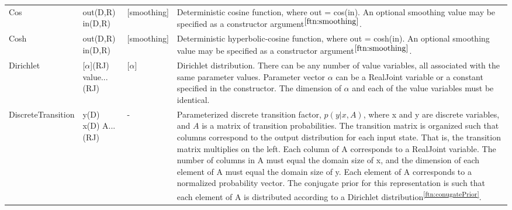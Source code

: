 \begin{longtable} {p{3.5cm} p{2.2cm} p{2cm} p{7cm}}
%
Cos & out(D,R) \newline in(D,R) & [smoothing] & Deterministic cosine function, where out = cos(in). An optional smoothing value may be specified as a constructor argument$^{\ref{ftn:smoothing}}$. \\
%
Cosh & out(D,R) \newline in(D,R) & [smoothing] & Deterministic hyperbolic-cosine function, where out = cosh(in). An optional smoothing value may be specified as a constructor argument$^{\ref{ftn:smoothing}}$. \\
%
Dirichlet & [$\alpha$](RJ) \newline value...(RJ) & [$\alpha$] & Dirichlet distribution.  There can be any number of value variables, all associated with the same parameter values.  Parameter vector $\alpha$ can be a RealJoint variable or a constant specified in the constructor.  The dimension of $\alpha$ and each of the value variables must be identical. \\
%
DiscreteTransition & y(D) \newline x(D) \newline A...(RJ) & - & 
Parameterized discrete transition factor, $p(y | x, A)$, where x and y are discrete variables, and $A$ is a matrix of transition probabilities. The transition matrix is organized such that columns correspond to the output distribution for each input state. That is, the transition matrix multiplies on the left. Each column of A corresponds to a RealJoint variable. The number of columns in A must equal the domain size of x, and the dimension of each element of A  must equal the domain size of y. \newline
Each element of A corresponds to a normalized probability vector.  The conjugate prior for this representation is such that each element of A is distributed according to a Dirichlet distribution\textsuperscript{\ref{ftn:conugatePrior}}.  \newline

\end{longtable}
